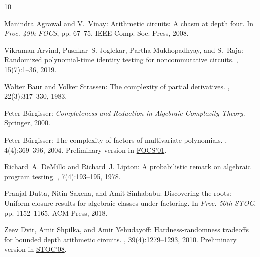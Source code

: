 \documentclass[11pt]{article}
\numberwithin{equation}{section}
\theoremstyle{definition}
\theoremstyle{plain}
\begin{document}
\tocrefpdfbookmark
\begin{thebibliography}{10}

{\sc Manindra Agrawal and V.~Vinay}: Arithmetic circuits: {A} chasm at depth
  four.
\newblock In {\em Proc. 49th FOCS}, pp. 67--75. IEEE Comp. Soc. Press, 2008.

{\sc Vikraman Arvind, Pushkar~S. Joglekar, Partha Mukhopadhyay, and S.~Raja}:
  Randomized polynomial-time identity testing for noncommutative circuits.
, 15(7):1--36, 2019.

{\sc Walter Baur and Volker Strassen}: The complexity of partial derivatives.
, 22(3):317--330, 1983.
\newblock [\epfmtdoi{10.1016/0304-3975(83)90110-X}]

{\sc Peter B{\"u}rgisser}: {\em Completeness and Reduction in Algebraic
  Complexity Theory}.
\newblock Springer, 2000.
\newblock [\epfmtdoi{10.1007/978-3-662-04179-6}]

{\sc Peter B{\"{u}}rgisser}: The complexity of factors of multivariate
  polynomials.
, 4(4):369--396, 2004.
\newblock Preliminary version in
  \href{https://doi.org/10.1109/SFCS.2001.959912}{FOCS'01}.
\newblock [\epfmtdoi{10.1007/s10208-002-0059-5}]

{\sc Richard~A. DeMillo and Richard~J. Lipton}: A probabilistic remark on
  algebraic program testing.
, 7(4):193--195, 1978.
\newblock [\epfmtdoi{10.1016/0020-0190(78)90067-4}]

{\sc Pranjal Dutta, Nitin Saxena, and Amit Sinhababu}: Discovering the roots:
  {U}niform closure results for algebraic classes under factoring.
\newblock In {\em Proc. 50th STOC}, pp. 1152--1165. ACM Press, 2018.

{\sc Zeev Dvir, Amir Shpilka, and Amir Yehudayoff}: Hardness-randomness
  tradeoffs for bounded depth arithmetic circuits.
, 39(4):1279--1293, 2010.
\newblock Preliminary version in
  \href{https://dl.acm.org/citation.cfm?id=1374482}{STOC'08}.
\newblock [\epfmtdoi{10.1137/080735850}]


\end{thebibliography}
\end{document}
